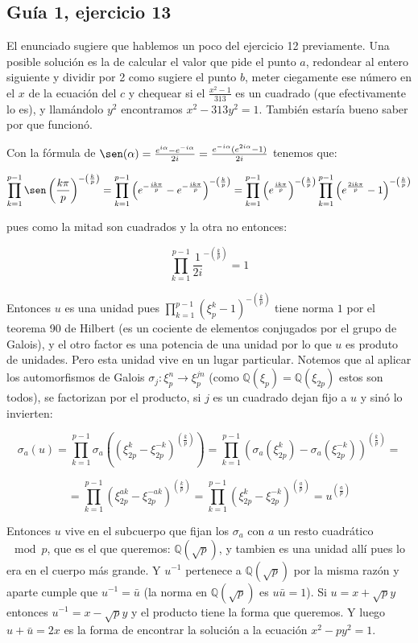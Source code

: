 \documentclass[12pt]{amsart}
\newcommand{\QQ}{\mathbb{Q}}
\newcommand{\lp}{\left(}
\newcommand{\rp}{\right)}
\theoremstyle{plain}
\begin{document}
\subsection*{Guía 1, ejercicio 13}

El enunciado sugiere que hablemos un poco del ejercicio 12 
previamente. Una posible solución es la de calcular el valor 
que pide el punto $a$, redondear al entero siguiente y dividir 
por 2 como sugiere el punto $b$, meter ciegamente ese número en 
el $x$ de la ecuación del $c$ y chequear si el $\frac{x^2-1}
{313}$ es un cuadrado (que efectivamente lo es), y llamándolo 
$y^2$ encontramos $x^2-313y^2=1$. También estaría bueno saber 
por que funcionó.

Con la fórmula de $\sen(\alpha) = \frac{e^{i\alpha}-
e^{-i\alpha}}{2i} = \frac{e^{-i\alpha}(e^{2i\alpha}-1
)}{2i}$ tenemos que:

$$\prod^{p-1}_{k=1} \sen\lp\frac{k\pi}{p}\rp
^{-\lp\frac{k}{p} \rp} = \prod^{p-1}_{k=1} \lp e^{-\frac
{ik\pi}{p}} - e^{-\frac{ik\pi}{p}}\rp^{-\lp
\frac{k}{p} \rp}= \prod^{p-1}_{k=1} \lp e^{\frac
{ik\pi}{p}}\rp^{-\lp \frac{k}{p} \rp} \prod^{p-1}_{k=1}
\lp e^{\frac{2ik\pi}{p}}-1\rp^{-\lp\frac{k}{p} \rp}$$

pues como la mitad son cuadrados y la otra no entonces:

$$\prod^{p-1}_{k=1} \frac{1}{2i} ^ {-\lp \frac{k}{p} \rp} = 1$$

Entonces $u$ es una unidad pues $\prod^{p-1}_{k=1} \lp 
\xi_p^k-1\rp^{-\lp\frac{k}{p} \rp}$ tiene norma $1$ por el 
teorema 90 de Hilbert (es un cociente de elementos conjugados
por el grupo de Galois), y el otro factor es una potencia de 
una unidad por lo que $u$ es produto de unidades. Pero esta
unidad vive en un lugar particular. Notemos que al aplicar los 
automorfismos de Galois $\sigma_j: \xi_{p}^n \to \xi_{p}^{jn}$
(como $\QQ(\xi_p) = \QQ(\xi_{2p})$ estos son todos),
se factorizan por el producto, si $j$ es un cuadrado dejan
fijo a $u$ y sinó lo invierten:

$$\sigma_a(u) = \prod_{k=1}^{p-1} \sigma_a \lp
(\xi_{2p}^k - \xi_{2p}^{-k})^{\lp\frac{k}{p}\rp}
\rp = \prod_{k=1}^{p-1} \lp\sigma_a \lp\xi_{2p}^k\rp
- \sigma_a \lp\xi_{2p}^{-k}\rp\rp^{\lp\frac{k}{p}\rp} = $$

$$=\prod_{k=1}^{p-1} \lp\xi_{2p}^{ak}
- \xi_{2p}^{-ak}\rp^{\lp\frac{k}{p}\rp}=\prod_{k=1}^{p-1}
\lp\xi_{2p}^{k} - \xi_{2p}^{-k}\rp^{\lp\frac{a}{p}\rp} = 
u^{\lp\frac{a}{p}\rp}$$

Entonces $u$ vive en el subcuerpo que fijan los $\sigma_a$ con
$a$ un resto cuadrático$\mod p$, que es el que queremos: 
$\QQ(\sqrt{p})$, y tambien es una unidad allí pues lo era en
el cuerpo más grande. Y $u^{-1}$ pertenece a $\QQ(\sqrt{p})$
por la misma razón y aparte cumple que $u^{-1}=\bar{u}$ (la
norma en $\QQ(\sqrt{p})$ es $u\bar{u}=1$). Si $u=x+\sqrt{p}y$
entonces $u^{-1}=x-\sqrt{p}y$ y el producto tiene la forma 
que queremos. Y luego $u+\bar{u}=2x$ es la forma de encontrar
la solución a la ecuación $x^2-py^2=1$. 
\end{document}
